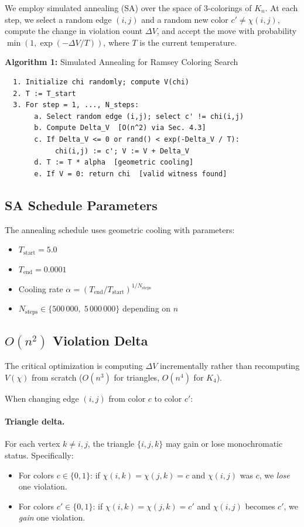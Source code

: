 \documentclass[11pt,a4paper]{article}
\theoremstyle{definition}
\theoremstyle{remark}
\begin{document}
We employ simulated annealing (SA) over the space of 3-colorings of
$K_n$.  At each step, we select a random edge $(i,j)$ and a random new
color $c' \ne \chi(i,j)$, compute the change in violation count
$\Delta V$, and accept the move with probability
$\min(1, \exp(-\Delta V / T))$, where $T$ is the current temperature.

\medskip
\noindent\textbf{Algorithm 1:} Simulated Annealing for Ramsey Coloring Search
\begin{verbatim}
  1. Initialize chi randomly; compute V(chi)
  2. T := T_start
  3. For step = 1, ..., N_steps:
       a. Select random edge (i,j); select c' != chi(i,j)
       b. Compute Delta_V  [O(n^2) via Sec. 4.3]
       c. If Delta_V <= 0 or rand() < exp(-Delta_V / T):
            chi(i,j) := c'; V := V + Delta_V
       d. T := T * alpha  [geometric cooling]
       e. If V = 0: return chi  [valid witness found]
\end{verbatim}
\label{alg:sa}

\subsection{SA Schedule Parameters}\label{sec:schedule}

The annealing schedule uses geometric cooling with parameters:
\begin{itemize}
  \item $T_{\text{start}} = 5.0$
  \item $T_{\text{end}} = 0.0001$
  \item Cooling rate $\alpha = (T_{\text{end}} / T_{\text{start}})^{1/N_{\text{steps}}}$
  \item $N_{\text{steps}} \in \{500\,000, \; 5\,000\,000\}$ depending on $n$
\end{itemize}

\subsection{$O(n^2)$ Violation Delta}\label{sec:delta}

The critical optimization is computing $\Delta V$ incrementally rather
than recomputing $V(\chi)$ from scratch ($O(n^3)$ for triangles, $O(n^4)$
for $K_4$).

When changing edge $(i,j)$ from color $c$ to color $c'$:

\paragraph{Triangle delta.}
For each vertex $k \ne i, j$, the triangle $\{i,j,k\}$ may gain or lose
monochromatic status.  Specifically:
\begin{itemize}
  \item For colors $c \in \{0,1\}$: if $\chi(i,k) = \chi(j,k) = c$ and
        $\chi(i,j)$ was $c$, we \emph{lose} one violation.
  \item For colors $c' \in \{0,1\}$: if $\chi(i,k) = \chi(j,k) = c'$ and
        $\chi(i,j)$ becomes $c'$, we \emph{gain} one violation.
\end{itemize}
\end{document}
